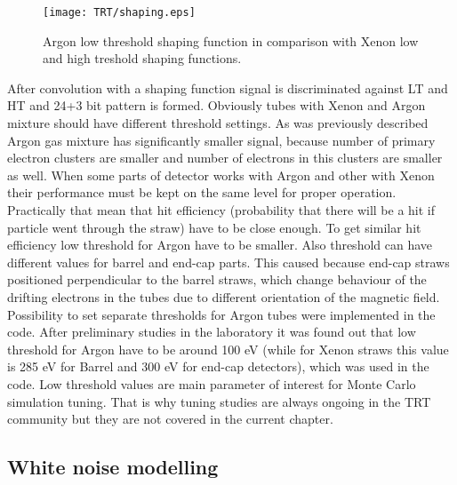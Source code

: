 \begin{figure}
\begin{center}
 \texttt{[image: TRT/shaping.eps]}
\caption{Argon low threshold shaping function in comparison with Xenon low and high treshold shaping functions.}
\label{fig:shaping}
\end{center}
\end{figure}


After convolution with a shaping function signal is discriminated against LT and HT and 24+3 bit pattern is formed.
Obviously tubes with Xenon and Argon mixture should have different threshold settings.
As was previously described Argon gas mixture has significantly smaller signal, because
number of primary electron clusters are smaller and number of electrons in this clusters are smaller as well.
When some parts of detector works with Argon and other with Xenon their performance must be kept on the same level for
proper operation. Practically that mean that hit efficiency (probability that there will be a hit if particle went through the straw) have to be close enough. To get similar hit efficiency low threshold for Argon have to be smaller.
Also threshold can have different values for barrel and end-cap parts. This caused because end-cap straws positioned perpendicular to the barrel straws, 
which change behaviour of the drifting electrons in the tubes due to different orientation of the magnetic field.
Possibility to set separate thresholds for Argon tubes were implemented in the code.
After preliminary studies in the laboratory it was found out that low threshold for Argon have to be around 100 eV 
(while for Xenon straws this value is 285 eV for Barrel and 300 eV for end-cap detectors), which was used in the code.
Low threshold values are main parameter of interest for Monte Carlo simulation tuning. That is why tuning studies are always ongoing 
in the TRT community but they are not covered in the current chapter.

\subsection{White noise modelling}

